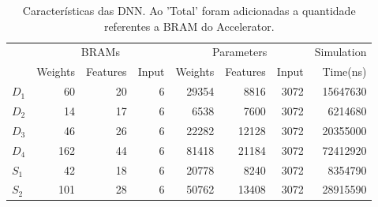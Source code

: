 \begin{table}[ht!]
\centering
\caption{Características das DNN. Ao 'Total' foram adicionadas a quantidade referentes a BRAM do Accelerator.}
\label{tab:5-dnn-report}
\begin{tabular}{lrrrrrrr}
\toprule
 & \multicolumn{3}{c}{BRAMs} & \multicolumn{3}{c}{Parameters} & Simulation \\
\cmidrule(r){2-4} \cmidrule(lr){5-7} \cmidrule(l){8-8}
 & Weights & Features & Input & Weights & Features & Input & Time(ns) \\
\midrule
$D_1$ & 60 & 20 & 6 & 29354 & 8816 & 3072 & 15647630 \\
$D_2$ & 14 & 17 & 6 & 6538 & 7600 & 3072 & 6214680 \\
$D_3$ & 46 & 26 & 6 & 22282 & 12128 & 3072 & 20355000 \\
$D_4$ & 162 & 44 & 6 & 81418 & 21184 & 3072 & 72412920 \\
$S_1$ & 42 & 18 & 6 & 20778 & 8240 & 3072 & 8354790 \\
$S_2$ & 101 & 28 & 6 & 50762 & 13408 & 3072 & 28915590 \\
\bottomrule
\end{tabular}
\end{table}